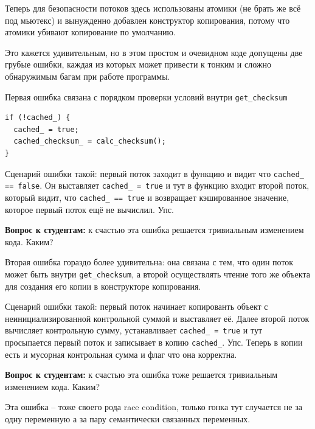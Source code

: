 \documentclass[a4paper,12pt,oneside]{book}
\newif\ifanswers
\begin{document}
Теперь для безопасности потоков здесь использованы атомики (не брать же всё под мьютекс) и вынужденно добавлен конструктор копирования, потому что атомики убивают копирование по умолчанию.

Это кажется удивительным, но в этом простом и очевидном коде допущены две грубые ошибки, каждая из которых может привести к тонким и сложно обнаружимым багам при работе программы.

Первая ошибка связана с порядком проверки условий внутри \lstinline!get_checksum!

\begin{lstlisting}
if (!cached_) {
  cached_ = true;
  cached_checksum_ = calc_checksum();
}
\end{lstlisting}

Сценарий ошибки такой: первый поток заходит в функцию и видит что \lstinline!cached_ == false!. Он выставляет \lstinline!cached_ = true! и тут в функцию входит второй поток, который видит, что \lstinline!cached_ == true! и возвращает кэшированное значение, которое первый поток ещё не вычислил. Упс.

\textbf{Вопрос к студентам:} к счастью эта ошибка решается тривиальным изменением кода. Каким?

\ifanswers
Правильный ответ: разумеется поменять местами строчки в теле условного оператора.
\fi

Вторая ошибка гораздо более удивительна: она связана с тем, что один поток может быть внутри \lstinline!get_checksum!, а второй осуществлять чтение того же объекта для создания его копии в конструкторе копирования.

Сценарий ошибки такой: первый поток начинает копированть объект с неинициализированной контрольной суммой и выставляет её. Далее второй поток вычисляет контрольную сумму, устанавливает \lstinline!cached_ = true! и тут просыпается первый поток и записывает в копию \lstinline!cached_!. Упс. Теперь в копии есть и мусорная контрольная сумма и флаг что она корректна.

\textbf{Вопрос к студентам:} к счастью эта ошибка тоже решается тривиальным изменением кода. Каким?

\ifanswers
Правильный ответ: разумеется снова поменять местами строчки. На этот раз в конструкторе копирования. Но при этом ещё и не забыть поменять местами поля в классе.
\fi

Эта ошибка -- тоже своего рода race condition, только гонка тут случается не за одну переменную а за пару семантически связанных переменных.
\end{document}
